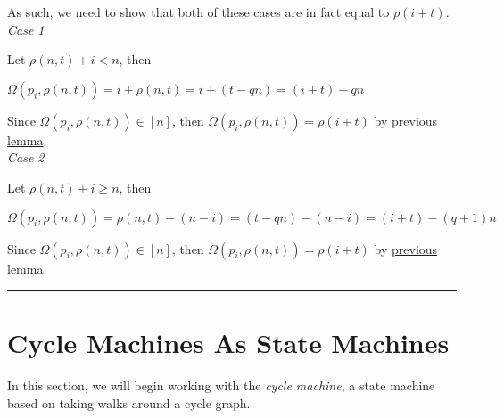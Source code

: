 \documentclass[a4paper,12pt]{article}
\begin{document}
\noindent As such, we need to show that both of these cases are in fact equal to $\rho(i + t)$.\\


\noindent
\textit{Case 1}

\noindent Let $\rho(n, t) + i < n$, then 
\begin{center}
$\Omega(p_i, \rho(n, t)) = i + \rho(n, t) = i + (t - qn) = (i + t) - qn$
\end{center}
Since $\Omega(p_i, \rho(n, t)) \in [n]$, then $\Omega(p_i, \rho(n, t)) = \rho(i + t)$ by \hyperlink{lemma:remainder_subtraction}{previous lemma}.\\


\noindent
\textit{Case 2}

\noindent Let $\rho(n, t) + i \geq n$, then 
\begin{center}
$\Omega(p_i, \rho(n, t)) = \rho(n, t) - (n - i) = (t - qn) - (n - i) = (i + t) - (q + 1)n$
\end{center}

\noindent Since $\Omega(p_i, \rho(n, t)) \in [n]$, then $\Omega(p_i, \rho(n, t)) = \rho(i + t)$ by \hyperlink{lemma:remainder_subtraction}{previous lemma}.


\begin{center}
\noindent\rule{8cm}{0.4pt}
\end{center}







\section{Cycle Machines As State Machines}
\label{section:cycle_machines_as_state_machines}
\hypertarget{section:cycle_machines}{}

\noindent In this section, we will begin working with the \textit{cycle machine}, a state machine based on taking walks around a cycle graph.\\
\end{document}
